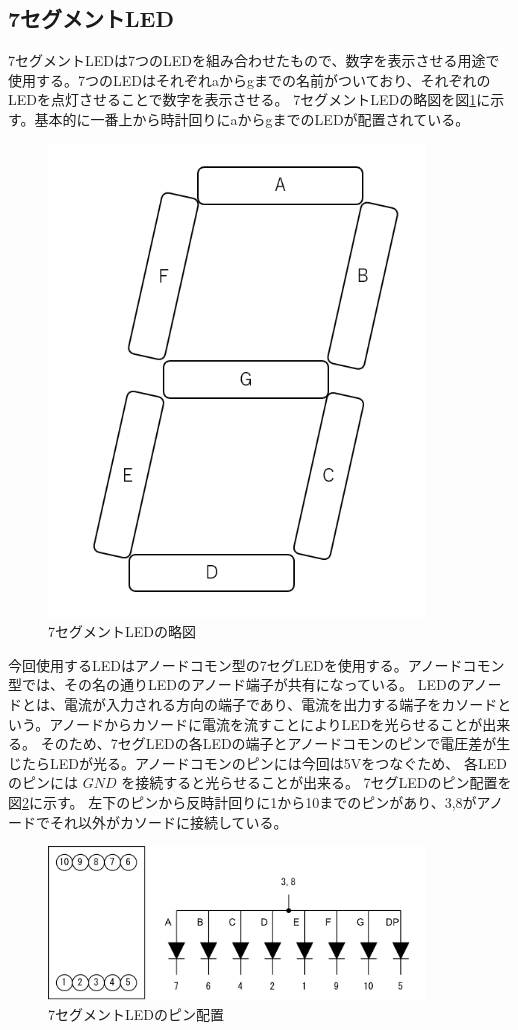 \documentclass[a4paper,11pt,dvipdfmx]{jsarticle}
\begin{document}
\subsection{7セグメントLED}
7セグメントLEDは7つのLEDを組み合わせたもので、数字を表示させる用途で使用する。7つのLEDはそれぞれaからgまでの名前がついており、それぞれのLEDを点灯させることで数字を表示させる。
7セグメントLEDの略図を図\ref{fig:7seg}に示す。基本的に一番上から時計回りにaからgまでのLEDが配置されている。
\begin{figure}[h]
  \centering
  \includegraphics[width=10cm]{./images/7seg.png}
  \caption{7セグメントLEDの略図}
  \label{fig:7seg}
\end{figure}
今回使用するLEDはアノードコモン型の7セグLEDを使用する。アノードコモン型では、その名の通りLEDのアノード端子が共有になっている。
LEDのアノードとは、電流が入力される方向の端子であり、電流を出力する端子をカソードという。アノードからカソードに電流を流すことによりLEDを光らせることが出来る。
そのため、7セグLEDの各LEDの端子とアノードコモンのピンで電圧差が生じたらLEDが光る。アノードコモンのピンには今回は5Vをつなぐため、
各LEDのピンには $GND$ を接続すると光らせることが出来る。
7セグLEDのピン配置を図\ref{fig:7segpin}に示す。
左下のピンから反時計回りに1から10までのピンがあり、3,8がアノードでそれ以外がカソードに接続している。
\begin{figure}[h]
  \centering
  \includegraphics[width=10cm]{./images/7segpin.png}
  \caption{7セグメントLEDのピン配置}
  \label{fig:7segpin}
\end{figure}
\end{document}
